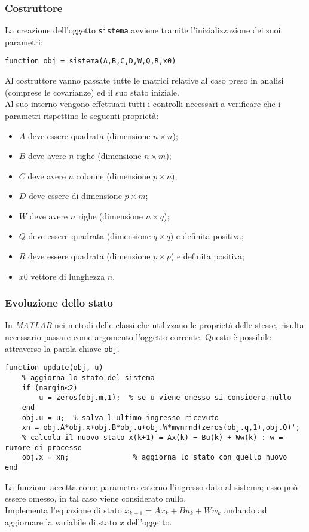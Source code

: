 \subsubsection{Costruttore}
La creazione dell'oggetto \texttt{sistema} avviene tramite l'inizializzazione dei suoi parametri:
\begin{lstlisting}[frame=single]
function obj = sistema(A,B,C,D,W,Q,R,x0)
\end{lstlisting}
Al costruttore vanno passate tutte le matrici relative al caso preso in analisi (comprese le covarianze) ed il suo stato iniziale.\\
Al suo interno vengono effettuati tutti i controlli necessari a verificare che i parametri rispettino le seguenti proprietà:
\begin{itemize}
\item $A$ deve essere quadrata (dimensione $n \times n$);
\item $B$ deve avere $n$ righe (dimensione $n \times m$);
\item $C$ deve avere $n$ colonne (dimensione $p \times n$);
\item $D$ deve essere di dimensione $p \times m$;
\item $W$ deve avere $n$ righe (dimensione $n \times q$);
\item $Q$ deve essere quadrata (dimensione $q \times q$) e definita positiva;
\item $R$ deve essere quadrata (dimensione $p \times p$) e definita positiva;
\item $x0$ vettore di lunghezza $n$.
\end{itemize}

\subsubsection{Evoluzione dello stato}
In \textit{MATLAB} nei metodi delle classi che utilizzano le proprietà delle stesse, risulta necessario passare come argomento l'oggetto corrente. Questo è possibile attraverso la parola chiave \texttt{obj}.
\begin{lstlisting}[frame=single]
function update(obj, u)
	% aggiorna lo stato del sistema
	if (nargin<2)
		u = zeros(obj.m,1);  % se u viene omesso si considera nullo
	end
	obj.u = u;  % salva l'ultimo ingresso ricevuto
	xn = obj.A*obj.x+obj.B*obj.u+obj.W*mvnrnd(zeros(obj.q,1),obj.Q)';
	% calcola il nuovo stato x(k+1) = Ax(k) + Bu(k) + Ww(k) : w = rumore di processo
	obj.x = xn;               % aggiorna lo stato con quello nuovo
end
\end{lstlisting}
La funzione accetta come parametro esterno l'ingresso dato al sistema; esso può essere omesso, in tal caso viene considerato nullo.\\
Implementa l'equazione di stato $x_{k+1}=Ax_k+Bu_k+Ww_k$ andando ad aggiornare la variabile di stato $x$ dell'oggetto.

